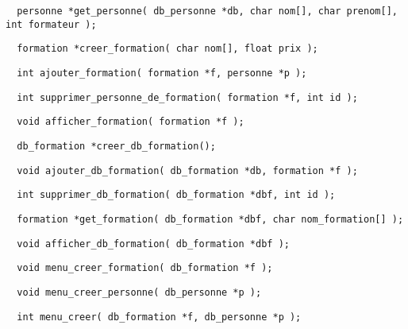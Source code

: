 \documentclass[11pt]{article}
\begin{document}
\begin{lstlisting}
  personne *get_personne( db_personne *db, char nom[], char prenom[], int formateur );
\end{lstlisting}

\begin{lstlisting}
  formation *creer_formation( char nom[], float prix );
\end{lstlisting}

\begin{lstlisting}
  int ajouter_formation( formation *f, personne *p );
\end{lstlisting}

\begin{lstlisting}
  int supprimer_personne_de_formation( formation *f, int id );
\end{lstlisting}

\begin{lstlisting}
  void afficher_formation( formation *f );
\end{lstlisting}

\begin{lstlisting}
  db_formation *creer_db_formation();
\end{lstlisting}

\begin{lstlisting}
  void ajouter_db_formation( db_formation *db, formation *f );
\end{lstlisting}

\begin{lstlisting}
  int supprimer_db_formation( db_formation *dbf, int id );
\end{lstlisting}

\begin{lstlisting}
  formation *get_formation( db_formation *dbf, char nom_formation[] );
\end{lstlisting}

\begin{lstlisting}
  void afficher_db_formation( db_formation *dbf );
\end{lstlisting}

\begin{lstlisting}
  void menu_creer_formation( db_formation *f );
\end{lstlisting}

\begin{lstlisting}
  void menu_creer_personne( db_personne *p );
\end{lstlisting}

\begin{lstlisting}
  int menu_creer( db_formation *f, db_personne *p );
\end{lstlisting}
\end{document}
